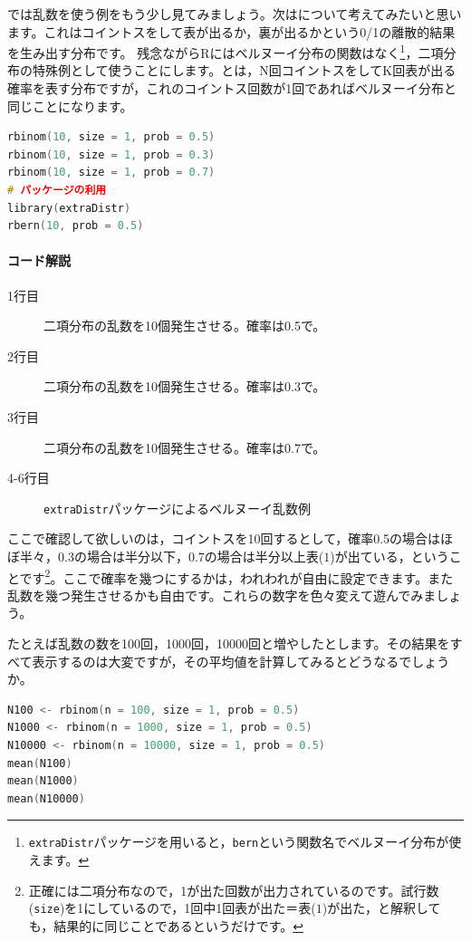 \documentclass{ltjsbook}
\begin{document}
では乱数を使う例をもう少し見てみましょう。次はについて考えてみたいと思います。これはコイントスをして表が出るか，裏が出るかという0/1の離散的結果を生み出す分布です。
残念ながらRにはベルヌーイ分布の関数はなく\footnote{\texttt{extraDistr}パッケージを用いると，\texttt{bern}という関数名でベルヌーイ分布が使えます。}，二項分布の特殊例として使うことにします。とは，N回コイントスをしてK回表が出る確率を表す分布ですが，これのコイントス回数が1回であればベルヌーイ分布と同じことになります。
\begin{lstlisting}[language=c++,label={code:17_02},caption={乱数のコードの例2}]
rbinom(10, size = 1, prob = 0.5)
rbinom(10, size = 1, prob = 0.3)
rbinom(10, size = 1, prob = 0.7)
# パッケージの利用
library(extraDistr)
rbern(10, prob = 0.5)
\end{lstlisting}
\paragraph{コード解説}
\begin{description}
	\item[1行目] 二項分布の乱数を10個発生させる。確率は0.5で。
	\item[2行目] 二項分布の乱数を10個発生させる。確率は0.3で。
	\item[3行目] 二項分布の乱数を10個発生させる。確率は0.7で。
	\item[4-6行目] \texttt{extraDistr}パッケージによるベルヌーイ乱数例
\end{description}

ここで確認して欲しいのは，コイントスを10回するとして，確率0.5の場合はほぼ半々，0.3の場合は半分以下，0.7の場合は半分以上表($1$)が出ている，ということです\footnote{正確には二項分布なので，1が出た回数が出力されているのです。試行数(\texttt{size})を1にしているので，1回中1回表が出た＝表($1$)が出た，と解釈しても，結果的に同じことであるというだけです。}。ここで確率を幾つにするかは，われわれが自由に設定できます。また乱数を幾つ発生させるかも自由です。これらの数字を色々変えて遊んでみましょう。

たとえば乱数の数を100回，1000回，10000回と増やしたとします。その結果をすべて表示するのは大変ですが，その平均値を計算してみるとどうなるでしょうか。
\begin{lstlisting}[language=c++,label={code:17_03},caption={乱数のコードの例3}]
N100 <- rbinom(n = 100, size = 1, prob = 0.5)
N1000 <- rbinom(n = 1000, size = 1, prob = 0.5)
N10000 <- rbinom(n = 10000, size = 1, prob = 0.5)
mean(N100)
mean(N1000)
mean(N10000)
\end{lstlisting}
\end{document}

